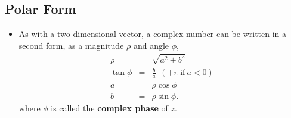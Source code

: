 \documentclass[12pt]{article}
\begin{document}
\subsection*{Polar Form}
\begin{itemize}
\item As with a two dimensional vector, a complex number can be
  written in a second form, as a magnitude $\rho$ and angle $\phi$,
  \begin{eqnarray}
    \nonumber
    \rho &=& \sqrt{a^2 + b^2}\\
    \tan \phi &=& \frac{b}{a} ~~(+ \pi~\mathrm{if}~a<0) \\\nonumber
    a &=& \rho \cos \phi\\
    b &=& \rho \sin \phi.
  \end{eqnarray}
  where $\phi$ is called the \textbf{complex phase} of $z$.

\end{itemize}
\end{document}
